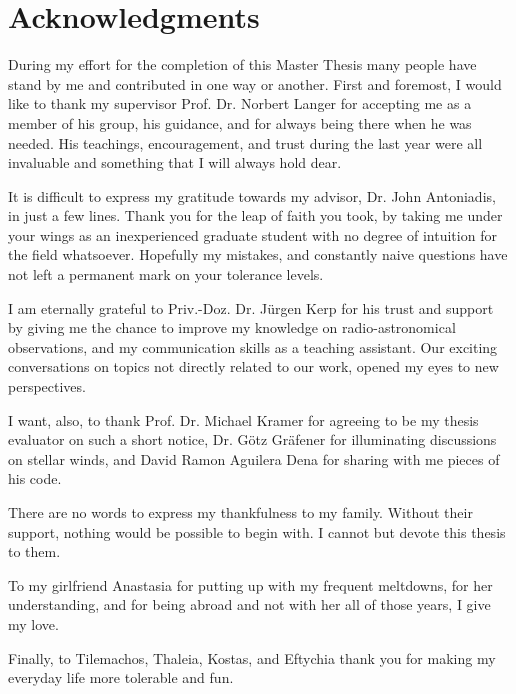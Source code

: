 \documentclass[../main/thesis_msc.tex]{subfiles}
\begin{document}
\chapter*{Acknowledgments}

During my effort for the completion of this Master Thesis many people have stand by me and contributed in one way or another. First and foremost, I would like to thank my supervisor Prof. Dr. Norbert Langer for accepting me as a member of his group, his guidance, and for always being there when he was needed. His teachings, encouragement, and trust during the last year were all invaluable and something that I will always hold dear.


It is difficult to express my gratitude towards my advisor, Dr. John Antoniadis, in just a few lines. Thank you for the leap of faith you took, by taking me under your wings as an inexperienced graduate student with no degree of intuition for the field whatsoever. Hopefully my mistakes, and constantly naive questions have not left a permanent mark on your tolerance levels.


I am eternally grateful to Priv.-Doz. Dr. J\"urgen Kerp for his trust and support by giving me the chance to improve my knowledge on radio-astronomical observations, and my communication skills as a teaching assistant. Our exciting conversations on topics not directly related to our work, opened my eyes to new perspectives. 

I want, also, to thank Prof. Dr. Michael Kramer for agreeing to be my thesis evaluator on such a short notice, Dr. G\"otz Gr\"afener for illuminating discussions on stellar winds, and David Ramon Aguilera Dena for sharing with me pieces of his code.


There are no words to express my thankfulness to my family. Without their support, nothing would be possible to begin with. I cannot but devote this thesis to them.


To my girlfriend Anastasia for putting up with my frequent meltdowns, for her understanding, and for being abroad and not with her all of those years, I give my love.


Finally, to Tilemachos, Thaleia, Kostas, and Eftychia thank you for making my everyday life more tolerable and fun.
\end{document}

